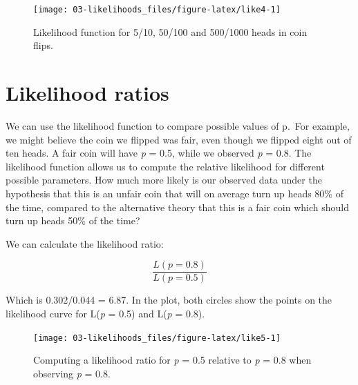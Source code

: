 \documentclass[
  oneside]{book}
\begin{document}
\begin{figure}

{\centering \texttt{[image: 03-likelihoods\_files/figure-latex/like4-1]} 

}

\caption{Likelihood function for 5/10, 50/100 and 500/1000 heads in coin flips.}\label{fig:like4}
\end{figure}

\hypertarget{likelihood-ratios}{%
\section{Likelihood ratios}\label{likelihood-ratios}}

We can use the likelihood function to compare possible values of p.~For example, we might believe the coin we flipped was fair, even though we flipped eight out of ten heads. A fair coin will have \emph{p} = 0.5, while we observed \emph{p} = 0.8. The likelihood function allows us to compute the relative likelihood for different possible parameters. How much more likely is our observed data under the hypothesis that this is an unfair coin that will on average turn up heads 80\% of the time, compared to the alternative theory that this is a fair coin which should turn up heads 50\% of the time?

We can calculate the likelihood ratio:

\[
\frac{L(p = 0.8)}{L(p = 0.5)}
\]

Which is 0.302/0.044 = 6.87. In the plot, both circles show the points on
the likelihood curve for L(\emph{p} = 0.5) and L(\emph{p} = 0.8).



\begin{figure}

{\centering \texttt{[image: 03-likelihoods\_files/figure-latex/like5-1]} 

}

\caption{Computing a likelihood ratio for \emph{p} = 0.5 relative to \emph{p} = 0.8 when observing \emph{p} = 0.8.}\label{fig:like5}
\end{figure}
\end{document}
